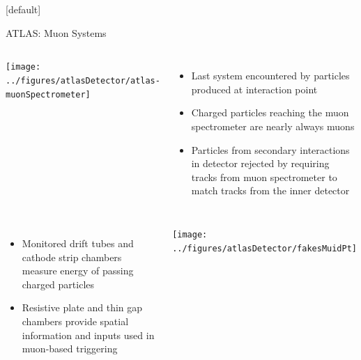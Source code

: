 \documentclass{beamer}
\begin{document}
{  \makeatletter %
  [default]
  \def\beamer@entrycode{\vspace*{-1.075\headheight}}
  \begin{frame}{ATLAS: Muon Systems}
    \begin{columns}
      \texttt{[image: ../figures/atlasDetector/atlas-muonSpectrometer]}
      \begin{itemize}\footnotesize
      \item Last system encountered by particles produced at interaction point
      \item Charged particles reaching the muon spectrometer are nearly always muons
      \item Particles from secondary interactions in detector rejected by requiring tracks from muon spectrometer to match tracks from the inner detector
      \end{itemize}  
    \end{columns}
    \begin{columns}
      \begin{itemize}\small
      \item Monitored drift tubes and cathode strip chambers measure energy of passing charged particles
      \item Resistive plate and thin gap chambers provide spatial information and inputs used in muon-based triggering

      \end{itemize}  
      \texttt{[image: ../figures/atlasDetector/fakesMuidPt]}
   \end{columns}
  \end{frame}

}
\end{document}
